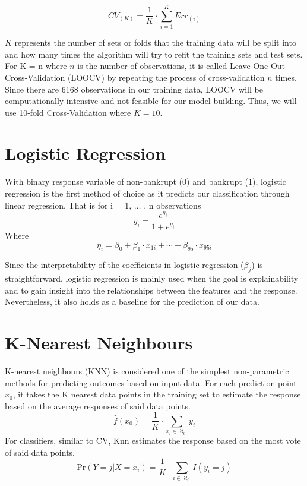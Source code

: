 \documentclass[12pt]{report}
\begin{document}
\begin{equation}
    CV_{(K)} = \frac{1}{K}\cdot\sum^{K}_{i=1}Err_{(i)}
\end{equation}

$K$ represents the number of sets or folds that the training data will be split into and how many times the algorithm will try to refit the training sets and test sets. For K = n where $n$ is the number of observations, it is called Leave-One-Out Cross-Validation (LOOCV) by repeating the process of cross-validation $n$ times. Since there are 6168 observations in our training data, LOOCV will be computationally intensive and not feasible for our model building. Thus, we will use 10-fold Cross-Validation where $K = 10$.

\section{Logistic Regression}
With binary response variable of non-bankrupt (0) and bankrupt (1), logistic regression is the first method of choice as it predicts our classification through linear regression. That is for i = 1, $\hdots$ , n observations
\begin{equation}
    y_i = \frac{e^{\eta_i}}{1+e^{\eta_i}}
\end{equation}
Where
\begin{equation}
    \eta_i = \beta_0+\beta_1\cdot x_{1i}+\cdots+\beta_{95}\cdot x_{95i}
\end{equation}

Since the interpretability of the coefficients in logistic regression ($\beta_{j}$) is straightforward, logistic regression is mainly used when the goal is explainability and to gain insight into the relationships between the features and the response. Nevertheless, it also holds as a baseline for the prediction of our data.

\section{K-Nearest Neighbours}

K-nearest neighbours (KNN) is considered one of the simplest non-parametric methods for predicting outcomes based on input data. For each prediction point $x_{0}$, it takes the K nearest data points in the training set to estimate the response based on the average responses of said data points. 
\begin{equation}
    \hat{f}(x_{0}) = \frac{1}{K}\cdot\sum_{x_{i}\in \aleph_{0}} y_{i}
\end{equation}
For classifiers, similar to CV, Knn estimates the response based on the most vote of said data points.
\begin{equation}
    \text{Pr}(Y=j|X=x_i) = \frac{1}{K}\cdot\sum_{i\in \aleph_{0}}I(y_i=j)
\end{equation}
\end{document}
